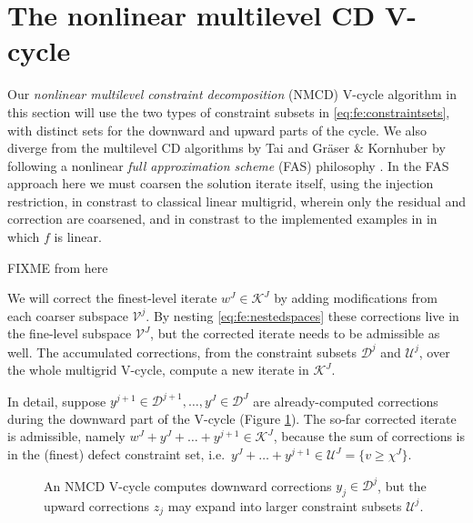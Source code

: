 \documentclass[letterpaper,final,12pt,reqno]{amsart}
\theoremstyle{cstyle}
\theoremstyle{cstyle*}
\theoremstyle{dstyle}
\numberwithin{equation}{section}
\numberwithin{figure}{section}
\numberwithin{table}{section}
\numberwithin{theorem}{section}
\begin{document}
\section{The nonlinear multilevel CD V-cycle} \label{sec:vcycle}

Our \emph{nonlinear multilevel constraint decomposition} (NMCD) V-cycle algorithm in this section will use the two types of constraint subsets in \eqref{eq:fe:constraintsets}, with distinct sets for the downward and upward parts of the cycle.  We also diverge from the multilevel CD algorithms by Tai \cite{Tai2003} and Gr\"aser \& Kornhuber \cite[Algorithm 4.7]{GraeserKornhuber2009} by following a nonlinear \emph{full approximation scheme} (FAS) philosophy \cite{BrandtLivne2011}.  In the FAS approach here we must coarsen the solution iterate itself, using the injection restriction, in constrast to classical linear multigrid, wherein only the residual and correction are coarsened, and in constrast to the implemented examples in \cite{GraeserKornhuber2009,Tai2003} in which $f$ is linear.

FIXME from here

We will correct the finest-level iterate $w^J\in \mathcal{K}^J$ by adding modifications from each coarser subspace $\mathcal{V}^j$.  By nesting \eqref{eq:fe:nestedspaces} these corrections live in the fine-level subspace $\mathcal{V}^J$, but the corrected iterate needs to be admissible as well.  The accumulated corrections, from the constraint subsets $\mathcal{D}^j$ and $\mathcal{U}^j$, over the whole multigrid V-cycle, compute a new iterate in $\mathcal{K}^J$.

In detail, suppose $y^{j+1} \in \mathcal{D}^{j+1}, \dots, y^J \in \mathcal{D}^J$ are already-computed corrections during the downward part of the V-cycle (Figure \ref{fig:nmcdvcycle}).  The so-far corrected iterate is admissible, namely $w^J + y^J + \dots + y^{j+1} \in \mathcal{K}^J$, because the sum of corrections is in the (finest) defect constraint set, i.e.~$y^J + \dots + y^{j+1} \in \mathcal{U}^J = \{v\ge \chi^J\}$.

\begin{figure}[ht]
\begin{center}

\end{center}
\caption{An NMCD V-cycle computes downward corrections $y_j \in \mathcal{D}^j$, but the upward corrections $z_j$ may expand into larger constraint subsets $\mathcal{U}^j$.}
\label{fig:nmcdvcycle}
\end{figure}
\end{document}
